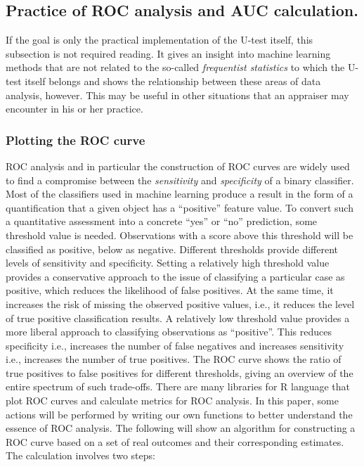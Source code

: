 \documentclass[]{scrreprt}
\begin{document}
\subsection{Practice of ROC analysis and AUC calculation.}\label{ROC-AUC-theory}
If the goal is only the practical implementation of the U-test itself, this subsection is not required reading. It gives an insight into machine learning methods that are not related to the so-called \emph{frequentist statistics} to which the U-test itself belongs and shows the relationship between these areas of data analysis, however. This may be useful in other situations that an appraiser may encounter in his or her practice.
%
\subsubsection{Plotting the ROC curve}\label{plot-ROC-theory}
%
%
ROC analysis and in particular the construction of ROC curves are widely used to find a compromise between the \emph{sensitivity} and \emph{specificity} of a binary classifier. Most of the classifiers used in machine learning produce a result in the form of a quantification that a given object has a ``positive'' feature value. To convert such a quantitative assessment into a concrete ``yes'' or ``no'' prediction, some threshold value is needed. Observations with a score above this threshold will be classified as positive, below as negative. Different thresholds provide different levels of sensitivity and specificity. Setting a relatively high threshold value provides a conservative approach to the issue of classifying a particular case as positive, which reduces the likelihood of false positives. At the same time, it increases the risk of missing the observed positive values, i.e., it reduces the level of true positive classification results. A relatively low threshold value provides a more liberal approach to classifying observations as ``positive''. This reduces specificity i.e., increases the number of false negatives and increases sensitivity i.e., increases the number of true positives. The ROC curve shows the ratio of true positives to false positives for different thresholds, giving an overview of the entire spectrum of such trade-offs. There are many libraries for R language that plot ROC curves and calculate metrics for ROC analysis. In this paper, some actions will be performed by writing our own functions to better understand the essence of ROC analysis. The following will show an algorithm for constructing a ROC curve based on a set of real outcomes and their corresponding estimates. The calculation involves two steps:
\end{document}
